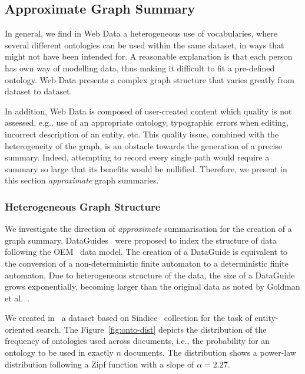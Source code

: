 \subsection{Approximate Graph Summary}
\label{sec:approximate}

In general, we find in Web Data a heterogeneous use of vocabularies, where several different ontologies can be used within the same dataset, in ways that might not have been intended for. A reasonable explanation is that each person has own way of modelling data, thus making it difficult to fit a pre-defined ontology. Web Data presents a complex graph structure that varies greatly from dataset to dataset.

In addition, Web Data is composed of user-created content which quality is not assessed, e.g., use of an appropriate ontology, typographic errors when editing, incorrect description of an entity, etc. This quality issue, combined with the heterogeneity of the graph, is an obstacle towards the generation of a precise summary. Indeed, attempting to record every single path would require a summary so large that its benefits would be nullified. Therefore, we present in this section \emph{approximate} graph summaries.

\subsubsection{Heterogeneous Graph Structure}

We investigate the direction of \emph{approximate} summarisation for the creation of a graph summary. DataGuides~\cite{goldman1997dataguides} were proposed to index the structure of data following the OEM~\cite{papakonstantinou:1995:oea} data model.
The creation of a DataGuide is equivalent to the conversion of a non-deterministic finite automaton to a deterministic finite automaton.
Due to heterogeneous structure of the data, the size of a DataGuide grows exponentially, becoming larger than the original data as noted by Goldman et al.~\cite{goldman1999approximate}.

We created in~\cite{campinas:2011:eos} a dataset based on Sindice~\cite{oren:2008:sdl} collection for the task of entity-oriented search. The Figure~\ref{fig:onto-dist} depicts the distribution of the frequency of ontologies used across documents, i.e., the probability for an ontology to be used in exactly $n$ documents. The distribution shows a power-law distribution following a Zipf function with a slope of $\alpha = 2.27$.

